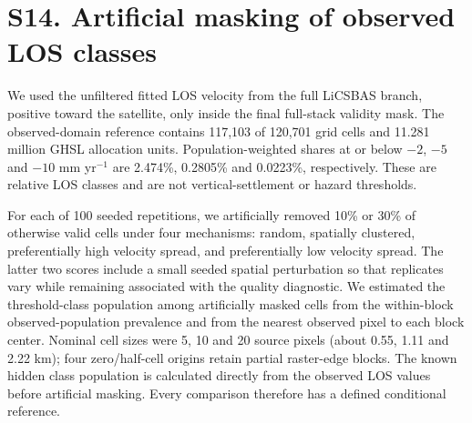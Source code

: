 \section*{S14. Artificial masking of observed LOS classes}
We used the unfiltered fitted LOS velocity from the full LiCSBAS branch, positive toward the satellite, only inside the final full-stack validity mask. The observed-domain reference contains 117,103 of 120,701 grid cells and 11.281 million GHSL allocation units. Population-weighted shares at or below $-2$, $-5$ and $-10$ mm yr$^{-1}$ are 2.474\%, 0.2805\% and 0.0223\%, respectively. These are relative LOS classes and are not vertical-settlement or hazard thresholds.

For each of 100 seeded repetitions, we artificially removed 10\% or 30\% of otherwise valid cells under four mechanisms: random, spatially clustered, preferentially high velocity spread, and preferentially low velocity spread. The latter two scores include a small seeded spatial perturbation so that replicates vary while remaining associated with the quality diagnostic. We estimated the threshold-class population among artificially masked cells from the within-block observed-population prevalence and from the nearest observed pixel to each block center. Nominal cell sizes were 5, 10 and 20 source pixels (about 0.55, 1.11 and 2.22 km); four zero/half-cell origins retain partial raster-edge blocks. The known hidden class population is calculated directly from the observed LOS values before artificial masking. Every comparison therefore has a defined conditional reference.

